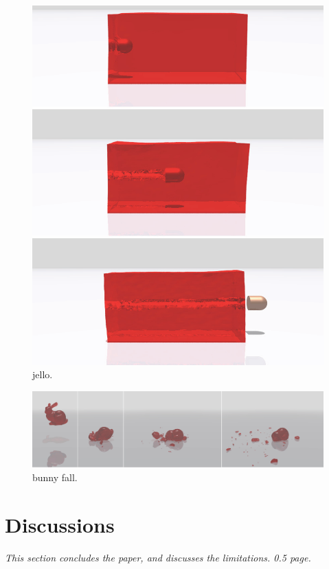 \begin{figure}[h]
  \centering
  \includegraphics[width=\linewidth]{./figs/demo_jello.eps}
  \caption{\label{fig:10}
  jello.
}
\end{figure}
\begin{figure}[t]
  \centering
  \includegraphics[width=\linewidth]{./figs/demo_fall_bunny.eps}
  \caption{\label{fig:11}
  bunny fall.
}
\end{figure}

\section{Discussions}

\emph{This section concludes the paper, and discusses the limitations. 0.5 page.}


%





